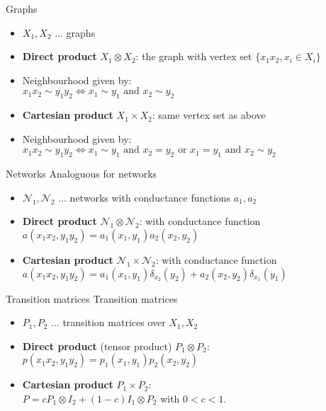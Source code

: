 \documentclass{beamer}\usepackage[]{graphicx}\usepackage[]{color}
\begin{document}
\begin{frame}[fragile]{Graphs}
\begin{itemize}
\item $X_1, X_2$ ... graphs
\item \textbf{Direct product} $X_1 \otimes X_2$: the graph with vertex set $\{x_1x_2, x_i \in X_i\}$
\item Neighbourhood given by: \\
$x_1 x_2 \sim y_1 y_2 \iff x_1\sim y_1 \text{ and } x_2 \sim y_2$
\item \textbf{Cartesian product} $X_1 \times X_2$: same vertex set as above
\item Neighbourhood given by: $x_1 x_2 \sim y_1 y_2 \iff x_1\sim y_1 \text{ and } x_2 = y_2 \text{ or } x_1 = y_1 \text{ and } x_2 \sim y_2$
\end{itemize}
\end{frame}

\begin{frame}[fragile]{Networks}
Analoguous for networks
\begin{itemize}
\item $\mathcal{N}_1, \mathcal{N}_2$ ... networks with conductance functions $a_1, a_2$
\item \textbf{Direct product} $\mathcal{N}_1 \otimes \mathcal{N}_2$: with conductance function\\
$a(x_1 x_2, y_1 y_2) =  a_1(x_1, y_1)a_2(x_2, y_2)$
\item \textbf{Cartesian product} $\mathcal{N}_1 \times \mathcal{N}_2$: with conductance function\\
$a(x_1 x_2, y_1 y_2) =  a_1(x_1, y_1)\delta_{x_2}(y_2) + a_2(x_2, y_2)\delta_{x_1}(y_1)$
\end{itemize}
\end{frame}

\begin{frame}[fragile]{Transition matrices}
Transition matrices
\begin{itemize}
\item $P_1, P_2$ ... transition matrices over $X_1, X_2$
\item \textbf{Direct product} (tensor product) $P_1 \otimes P_2$:\\
$p(x_1 x_2, y_1 y_2) =  p_1(x_1, y_1)p_2(x_2, y_2)$
\item \textbf{Cartesian product} $P_1 \times P_2$:\\
$P = c P_1 \otimes I_2 + (1 - c) I_1 \otimes P_2$ with $0<c<1$.
\end{itemize}
\end{frame}
\end{document}
